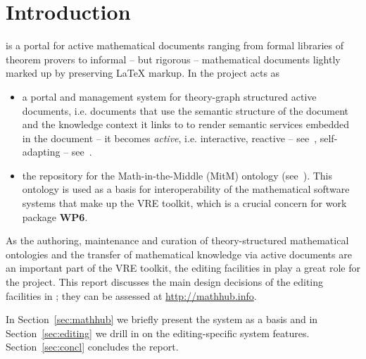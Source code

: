 \section{Introduction}\label{sec:intro}

\sys is a portal for active mathematical documents ranging from formal libraries of
theorem provers to informal -- but rigorous -- mathematical documents lightly marked up by
preserving {\LaTeX} markup. In the \pn project \sys acts as 
\begin{itemize}
\item a portal and management system for theory-graph structured active documents,
  i.e. documents that use the semantic structure of the document and the knowledge context
  it links to to render semantic services embedded in the document -- it becomes
  \emph{active}, i.e. interactive, reactive -- see~\cite{ODK-D4.3}, self-adapting --
  see~\cite{ODK-D4.2}.
\item the repository for the Math-in-the-Middle (MitM) ontology
  (see~\cite{DehKohKon:iop16,ODK-D6.2}). This ontology is used as a basis for
  interoperability of the mathematical software systems that make up the \pn VRE toolkit,
  which is a crucial concern for work package \textbf{WP6}.
\end{itemize}
As the authoring, maintenance and curation of theory-structured mathematical ontologies
and the transfer of mathematical knowledge via active documents are an important part of
the \pn VRE toolkit, the editing facilities in \sys play a great role for the
project. This report discusses the main design decisions of the editing facilities in
\sys; they can be assessed at \url{http://mathhub.info}.

In Section~\ref{sec:mathhub} we briefly present the \sys system as a basis and in
Section~\ref{sec:editing} we drill in on the editing-specific system
features. Section~\ref{sec:concl} concludes the report. 


